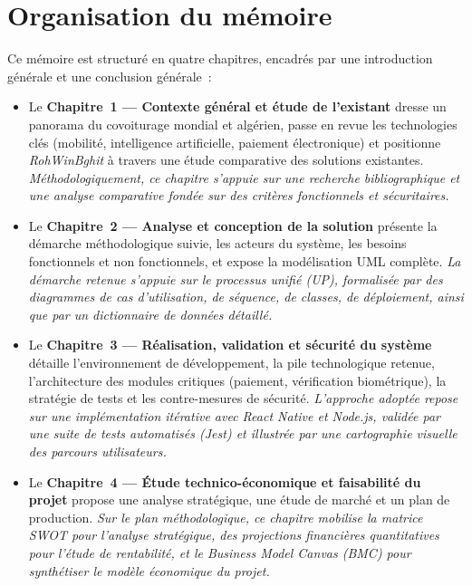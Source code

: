 \documentclass[12pt, a4paper, oneside]{report}
\begin{document}
\section*{Organisation du mémoire}

Ce mémoire est structuré en quatre chapitres, encadrés par une introduction générale et une conclusion générale~:

\begin{itemize}[leftmargin=1.8em]
  \item Le \textbf{Chapitre~1 --- Contexte général et étude de l'existant} dresse un panorama du covoiturage mondial et algérien, passe en revue les technologies clés (mobilité, intelligence artificielle, paiement électronique) et positionne \textit{RohWinBghit} à travers une étude comparative des solutions existantes. \textit{Méthodologiquement, ce chapitre s'appuie sur une recherche bibliographique et une analyse comparative fondée sur des critères fonctionnels et sécuritaires.}

  \item Le \textbf{Chapitre~2 --- Analyse et conception de la solution} présente la démarche méthodologique suivie, les acteurs du système, les besoins fonctionnels et non fonctionnels, et expose la modélisation UML complète. \textit{La démarche retenue s'appuie sur le processus unifié (UP), formalisée par des diagrammes de cas d'utilisation, de séquence, de classes, de déploiement, ainsi que par un dictionnaire de données détaillé.}

  \item Le \textbf{Chapitre~3 --- Réalisation, validation et sécurité du système} détaille l'environnement de développement, la pile technologique retenue, l'architecture des modules critiques (paiement, vérification biométrique), la stratégie de tests et les contre-mesures de sécurité. \textit{L'approche adoptée repose sur une implémentation itérative avec React Native et Node.js, validée par une suite de tests automatisés (Jest) et illustrée par une cartographie visuelle des parcours utilisateurs.}

  \item Le \textbf{Chapitre~4 --- Étude technico-économique et faisabilité du projet} propose une analyse stratégique, une étude de marché et un plan de production. \textit{Sur le plan méthodologique, ce chapitre mobilise la matrice SWOT pour l'analyse stratégique, des projections financières quantitatives pour l'étude de rentabilité, et le Business Model Canvas (BMC) pour synthétiser le modèle économique du projet.}
\end{itemize}
\end{document}
